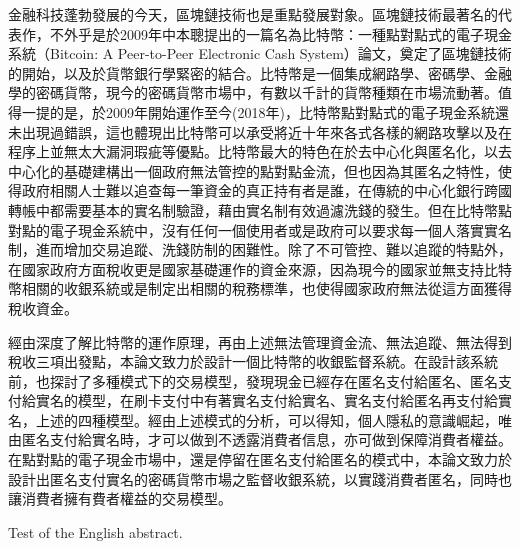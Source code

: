 
\begin{cabstract}
	金融科技蓬勃發展的今天，區塊鏈技術也是重點發展對象。區塊鏈技術最著名的代表作，不外乎是於2009年中本聰提出的一篇名為比特幣：一種點對點式的電子現金系統（Bitcoin: A Peer-to-Peer Electronic Cash System）論文\parencite{bitcoinpaper}，奠定了區塊鏈技術的開始，以及於貨幣銀行學緊密的結合。比特幣是一個集成網路學、密碼學、金融學的密碼貨幣，現今的密碼貨幣市場中，有數以千計的貨幣種類在市場流動著。值得一提的是，於2009年開始運作至今(2018年)，比特幣點對點式的電子現金系統還未出現過錯誤，這也體現出比特幣可以承受將近十年來各式各樣的網路攻擊以及在程序上並無太⼤漏洞瑕疵等優點。比特幣最大的特色在於去中心化與匿名化，以去中⼼化的基礎建構出⼀個政府無法管控的點對點⾦流，但也因為其匿名之特性，使得政府相關人⼠難以追查每⼀筆資⾦的真正持有者是誰，在傳統的中心化銀行跨國轉帳中都需要基本的實名制驗證，藉由實名制有效過濾洗錢的發生。但在比特幣點對點的電子現金系統中，沒有任何一個使用者或是政府可以要求每一個人落實實名制，進而增加交易追蹤、洗錢防制的困難性。除了不可管控、難以追蹤的特點外，在國家政府方面稅收更是國家基礎運作的資⾦來源，因為現今的國家並無支持比特幣相關的收銀系統或是制定出相關的稅務標準，也使得國家政府無法從這方面獲得稅收資金。

	經由深度了解比特幣的運作原理，再由上述無法管理資金流、無法追蹤、無法得到稅收三項出發點，本論文致力於設計一個比特幣的收銀監督系統。在設計該系統前，也探討了多種模式下的交易模型，發現現金已經存在匿名支付給匿名、匿名支付給實名的模型，在刷卡支付中有著實名支付給實名、實名支付給匿名再支付給實名，上述的四種模型。經由上述模式的分析，可以得知，個人隱私的意識崛起，唯由匿名支付給實名時，才可以做到不透露消費者信息，亦可做到保障消費者權益。在點對點的電子現金市場中，還是停留在匿名支付給匿名的模式中，本論⽂致⼒於設計出匿名⽀付實名的密碼貨幣市場之監督收銀系統，以實踐消費者匿名，同時也讓消費者擁有費者權益的交易模型。
\end{cabstract}

\begin{eabstract}
	Test of the English abstract.
\end{eabstract}

